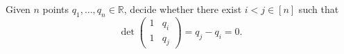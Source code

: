 \begin{problem}
	Given \(n\) points \(q_1, \ldots, q_n \in \mathbb{R}\), decide
	whether there exist \(i < j \in [n]\) such that
	\begin{displaymath}
		\det
		\left(
		\begin{matrix}
		1 & q_i \\
		1 & q_j
		\end{matrix}
		\right)
		= q_j - q_i
		= 0.
	\end{displaymath}
\end{problem}
